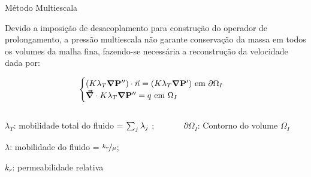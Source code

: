 \documentclass[professionalfont]{beamer}
\begin{document}
\begin{frame}{Método Multiescala}
    
    \small
    Devido a imposição de desacoplamento para construção do operador de prolongamento, a pressão multiescala não garante conservação da massa em todos os volumes da malha fina, fazendo-se necessária a reconstrução da velocidade \cite{Moyner_2014,Jenny2003} dada por:

    \begin{equation}
        \label{eq:5_5_4.1}
        \begin{cases}
          (K \lambda_{T} \mbox{\boldmath$ \nabla $} \mathbf{P}'') \cdot \vec{n} = (K \lambda_{T} \mbox{\boldmath$ \nabla $} \bold{P}') \text{ em } \partial \Omega_{I}\\
          \mbox{\boldmath$ \vec{\nabla} $} \cdot K \lambda_{T} \mbox{\boldmath$ \nabla $} \mathbf{P}'' = q \text{ em } \Omega_{I}\\
        \end{cases}
      \end{equation}

      \begin{columns}
        \begin{column}{0.5\textwidth}
            \begin{description}[]
                \item $\lambda_{T}$: mobilidade total do fluido = $\sum_{j} \lambda_{j}$ ;
                \item $\lambda$: mobilidade do fluido = $\nicefrac{k_{r}}{\mu}$;
                \item $k_r$: permeabilidade relativa 
              \end{description}
        \end{column}
        \begin{column}{0.5\textwidth}
            \begin{description}[]
                \item $\partial \Omega_{I}$: Contorno do volume $\Omega_{I}$ 
              \end{description}
        \end{column}

      \end{columns}
\end{frame}

    
\end{document}

